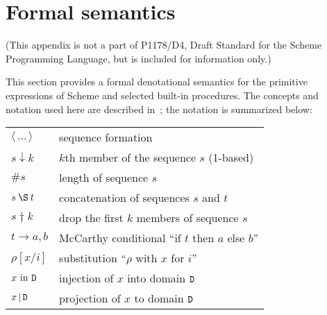 \chapter{Formal semantics}

\label{formalsemanticssection}

\bgroup

\newcommand{\sembrack}[1]{[\![#1]\!]}
\newcommand{\fun}[1]{\hbox{\it #1}}
\newenvironment{semfun}{\begin{tabbing}$}{$\end{tabbing}}
\newcommand\LOC{{\tt{}L}}
\newcommand\NAT{{\tt{}N}}
\newcommand\TRU{{\tt{}T}}
\newcommand\SYM{{\tt{}Q}}
\newcommand\CHR{{\tt{}H}}
\newcommand\NUM{{\tt{}R}}
\newcommand\FUN{{\tt{}F}}
\newcommand\EXP{{\tt{}E}}
\newcommand\STV{{\tt{}E}}
\newcommand\STO{{\tt{}S}}
\newcommand\ENV{{\tt{}U}}
\newcommand\ANS{{\tt{}A}}
\newcommand\ERR{{\tt{}X}}
\newcommand\EC{{\tt{}K}}
\newcommand\CC{{\tt{}C}}
\newcommand\MSC{{\tt{}M}}
\newcommand\PAI{\hbox{\EXP$_{\rm p}$}}
\newcommand\VEC{\hbox{\EXP$_{\rm v}$}}
\newcommand\STR{\hbox{\EXP$_{\rm s}$}}

\newcommand\elt{\downarrow}
\newcommand\drop{\dagger}

(This appendix is not a part of P1178/D4, Draft Standard for the
Scheme Programming Language, but is included for information only.)

This section provides a formal denotational semantics for the primitive
expressions of Scheme and selected built-in procedures.  The concepts
and notation used here are described in~\cite{Stoy77}; the notation is
summarized below:

\begin{tabular}{ll}
$\langle\,\ldots\,\rangle$ & sequence formation \\
$s \elt k$	           & $k$th member of the sequence $s$ (1-based) \\
$\#s$			   & length of sequence $s$ \\
$s \:\S\: t$	           & concatenation of sequences $s$ and $t$ \\
$s \drop k$                & drop the first $k$ members of sequence $s$ \\
$t \rightarrow a, b$       & McCarthy conditional ``if $t$ then $a$ else $b$'' \\
$\rho[x/i]$	           & substitution ``$\rho$ with $x$ for $i$'' \\
$x\hbox{ \rm in }{\tt{}D}$         & injection of $x$ into domain ${\tt{}D}$ \\
$x\,\vert\,{\tt{}D}$	   & projection of $x$ to domain ${\tt{}D}$
\end{tabular}

